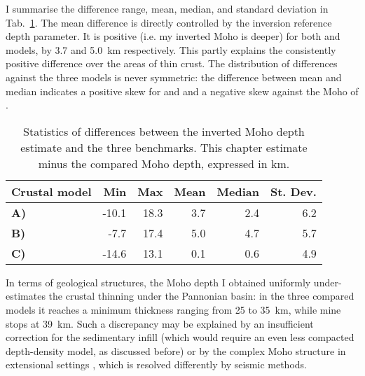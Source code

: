 I summarise the difference range, mean, median, and standard deviation in Tab.~\ref{tab:MohoCompStats}.
The mean difference is directly controlled by the inversion reference depth parameter.
It is positive (i.e. my inverted Moho is deeper) for both \textcite{Grad2009} and \textcite{Reguzzoni2015} models, by 3.7 and 5.0~\si{\kilo \metre} respectively.
This partly explains the consistently positive difference over the areas of thin crust.
The distribution of differences against the three models is never symmetric: the difference between mean and median indicates a positive skew for \textcite{Grad2009} and \textcite{Reguzzoni2015} and a negative skew against the Moho of \textcite{Pasyanos2014}.

\begin{table}
    \caption[Statistics of differences between the Moho depth estimate and the three benchmarks.]{Statistics of differences between the inverted Moho depth estimate and the three benchmarks. This chapter estimate minus the compared Moho depth, expressed in \si{\kilo \metre}.}
    \begin{adjustbox}{center}
    \begingroup\setlength{\fboxsep}{0pt}
    \colorbox{tablebackground}{%
	\begin{tabular}{lrrrrr}
		\toprule
		 \textbf{Crustal model} & \textbf{Min} & \textbf{Max} & \textbf{Mean} & \textbf{Median} & \textbf{St. Dev.} \\
		\midrule
		\textbf{A)}~\textcite{Grad2009} & -10.1 & 18.3 & 3.7 & 2.4 & 6.2 \\
		\textbf{B)}~\textcite{Reguzzoni2015} & -7.7 & 17.4 & 5.0 & 4.7 & 5.7 \\
		\textbf{C)}~\textcite{Pasyanos2014} & -14.6 & 13.1 & 0.1 & 0.6 & 4.9 \\
		\bottomrule
    \end{tabular}
    }\endgroup
    \end{adjustbox}
	\label{tab:MohoCompStats}
\end{table}

In terms of geological structures, the Moho depth I obtained uniformly under-estimates the crustal thinning under the Pannonian basin: in the three compared models it reaches a minimum thickness ranging from 25 to 35~\si{\kilo \metre}, while mine stops at 39~\si{\kilo \metre}.
Such a discrepancy may be explained by an insufficient correction for the sedimentary infill (which would require an even less compacted depth-density model, as discussed before) or by the complex Moho structure in extensional settings \parencite[e.g. due to underplating, see][]{OReilly2013}, which is resolved differently by seismic methods.

